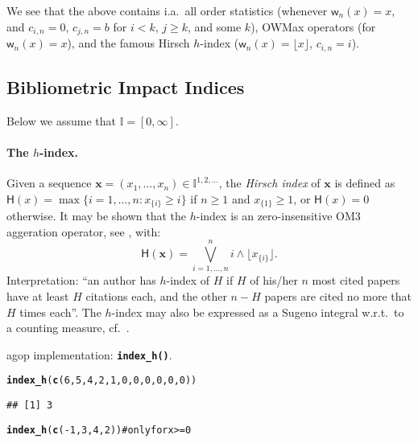 \documentclass[11pt]{article}\usepackage{graphicx, color}
\makeatletter
\newcommand{\hlfunctioncall}[1]{\textcolor[rgb]{0.501960784313725,0,0.329411764705882}{\textbf{#1}}}%
\newcommand{\hlcomment}[1]{\textcolor[rgb]{0.180392156862745,0.6,0.341176470588235}{#1}}%
\newenvironment{kframe}{%
 \def\at@end@of@kframe{}%
 \ifinner\ifhmode%
  \def\at@end@of@kframe{\end{minipage}}%
  \begin{minipage}{\columnwidth}%
 \fi\fi%
 \def\FrameCommand##1{\hskip\@totalleftmargin \hskip-\fboxsep
 \colorbox{shadecolor}{##1}\hskip-\fboxsep
     \hskip-\linewidth \hskip-\@totalleftmargin \hskip\columnwidth}%
 \MakeFramed {\advance\hsize-\width
   \@totalleftmargin\z@ \linewidth\hsize
   \@setminipage}}%
 {\par\unskip\endMakeFramed%
 \at@end@of@kframe}
\newenvironment{knitrout}{}{} %
\renewcommand{\emph}[1]{\textsl{#1}}
\newcommand{\package}[1]{\textsf{#1}\xspace}
\newcommand{\Rfunc}[1]{\texttt{\hlfunctioncall{#1}}}
\newcommand{\vect}[1]{{\mathbf{#1}}}
\newcommand{\func}[1]{{\mathsf{#1}}}
\newcommand{\Ival}{\mathbb{I}}
\newcommand{\AnyPow}{^{1,2,\dots}}
\newcommand{\IvalAnyPow}{\mathbb{I}\AnyPow}
\theoremstyle{remark}
\theoremstyle{definition}
\makeatother
\begin{document}
We see that the above contains i.a.~all
order statistics (whenever $\func{w}_n(x)=x$,
and $c_{i,n}=0$, $c_{j,n}=b$ for $i< k$, $j\ge k$, and some $k$),
OWMax operators (for $\func{w}_n(x)=x$),
and the famous Hirsch $h$-index ($\func{w}_n(x)=\lfloor x\rfloor$, $c_{i,n}=i$).


\subsection{Bibliometric Impact Indices}

Below we assume that $\Ival=[0,\infty]$.


\paragraph{The $h$-index.}
Given a sequence $\vect{x}=(x_1,\dots,x_n)\in\IvalAnyPow$,
the \emph{Hirsch index} \cite{Hirsch2005:hindex} of $\vect{x}$ is defined as
$\func{H}(x)=\max\{i=1,\dots,n: x_{\{i\}} \ge i\}$
if $n \ge 1$ and $x_{\{1\}} \ge 1$, or $\func{H}(x)=0$ otherwise.
It may be shown that the $h$-index is an zero-insensitive
OM3 aggeration operator,
see \cite{Gagolewski2013:om3}, with:
\[
   \func{H}(\vect{x}) = \bigvee_{i=1,\dots,n}^n i\wedge \lfloor x_{\{i\}}\rfloor.
\]
Interpretation: ``an author has $h$-index of $H$ if $H$ of his/her
$n$ most cited papers have at least $H$ citations each, and the other $n-H$
papers are cited no more that $H$ times each''.
The $h$-index may also be expressed as a Sugeno 
integral \cite{Sugeno1974:PhD}
w.r.t.~to a counting measure, cf.~\cite{TorraNarukawa2008:h2fuzzyintegrals}.

\package{agop} implementation: \Rfunc{index\_h()}.

\begin{knitrout}\small
{}\color{fgcolor}\begin{kframe}
\begin{alltt}
\hlfunctioncall{index_h}(\hlfunctioncall{c}(6,5,4,2,1,0,0,0,0,0,0))
\end{alltt}
\begin{verbatim}
## [1] 3
\end{verbatim}
\begin{alltt}
\hlfunctioncall{index_h}(\hlfunctioncall{c}(-1,3,4,2)) \hlcomment{# only for x>=0}
\end{alltt}


{\ttfamily\noindent\bfseries\color{errorcolor}{\#\# Error: all elements in `x` should be in [0,Inf]}}\end{kframe}
\end{knitrout}
\end{document}
